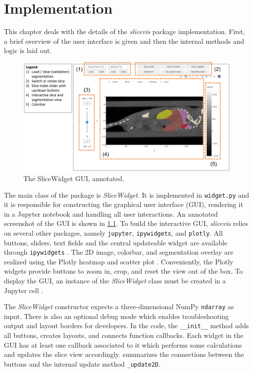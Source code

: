 \chapter{Implementation}
This chapter deals with the details of the \emph{slicevis} package implementation. First, a brief overview of the user interface is given and then the internal methods and logic is laid out.

\begin{figure}[h]
	\centering
	\includegraphics[width=\linewidth]{figures/GUI.png}
	\caption{The SliceWidget GUI, annotated.}
	\label{fig:gui}
\end{figure}

The main class of the package is \emph{SliceWidget}. It is implemented in \texttt{widget.py} and it is responsible for constructing the graphical user interface (GUI), rendering it in a Jupyter notebook and handling all user interactions. An annotated screenshot of the GUI is shown in \cref{fig:gui}. To build the interactive GUI, \emph{slicevis} relies on several other packages, namely \texttt{jupyter}, \texttt{ipywidgets}, and \texttt{plotly}. All buttons, sliders, text fields and the central updateable widget are available through \texttt{ipywidgets} \cite{ipywidget}. The 2D image, colorbar, and segmentation overlay are realized using the Plotly heatmap and scatter plot \cite{plotly}. Conveniently, the Plotly widgets provide buttons to zoom in, crop, and reset the view out of the box. To display the GUI, an instance of the \emph{SliceWidget} class must be created in a Jupyter cell \cite{jupyter}.

The \emph{SliceWidget} constructor expects a three-dimensional NumPy \texttt{ndarray} as input. There is also an optional debug mode which enables troubleshooting output and layout borders for developers. In the code, the \texttt{\_\_init\_\_} method adds all buttons, creates layouts, and connects function callbacks. Each widget in the GUI has at least one callback associated to it which performs some calculations and updates the slice view accordingly.  summarizes the connections between the buttons and the internal update method \texttt{\_update2D}.

